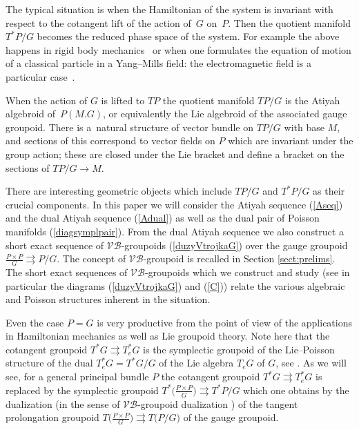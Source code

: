 \documentclass[pdftex]{sigma}
\renewcommand{\to}{\rightarrow}
\newcommand{\tto}{\rightrightarrows}
\numberwithin{equation}{section}
\begin{document}
The typical situation is when the Hamiltonian of the system is invariant with respect to the cotangent lift of the action of~$G$ on~$P$. Then the quotient manifold $T^*P/G$ becomes the reduced phase space of the system. For example the above happens in rigid body mechanics~\cite{MW} or when one formulates the equation of motion of a classical particle in a Yang--Mills f\/ield: the electromagnetic f\/ield is a particular case~\cite{Stern, Weinstein:1977}.

When the action of $G$ is lifted to $TP$ the quotient manifold $TP/G$ is the Atiyah algebroid of~$P(M.G)$, or equivalently the Lie algebroid of the associated gauge groupoid. There is a~natural structure of vector bundle on $TP/G$ with base $M$, and sections of this correspond to vector f\/ields on $P$ which are invariant under the group action; these are closed under the Lie bracket and def\/ine a bracket on the sections of $TP/G\to M$.

There are interesting geometric objects which include $TP/G$ and $T^*P/G$ as their crucial components. In this paper we will consider the Atiyah sequence (\ref{Aseq}) and the dual Atiyah sequence (\ref{Adual}) as well as the dual pair of Poisson manifolds (\ref{diagsymplpair}). From the dual Atiyah sequence we also construct a short exact sequence of $\mathcal{V}\!\mathcal{B}$-groupoids (\ref{duzyVtrojkaG}) over the gauge groupoid $\frac{P\times P}{G}\tto P/G$. The concept of $\mathcal{V}\!\mathcal{B}$-groupoid \cite{Pradines:1988} is recalled in Section \ref{sect:prelims}. The short exact sequences of $\mathcal{V}\!\mathcal{B}$-groupoids which we construct and study (see in particular the diagrams (\ref{duzyVtrojkaG}) and (\ref{C})) relate the various algebraic and Poisson structures inherent in the situation.

Even the case $P=G$ is very productive from the point of view of the applications in Hamiltonian mechanics as well as Lie groupoid theory. Note here that the cotangent groupoid $T^*G\tto T_e^*G$ is the symplectic groupoid of the Lie--Poisson structure of the dual $T^*_eG=T^*G/G$ of the Lie algebra $T_eG$ of $G$, see \cite{Wei}. As we will see, for a general principal bundle $P$ the cotangent groupoid $T^*G\tto T^*_e{G}$ is replaced by the symplectic groupoid $T^*\big(\frac{P\times P}{G}\big)\tto T^*P/G$ which one obtains by the dualization (in the sense of $\mathcal{V}\!\mathcal{B}$-groupoid dualization \cite{Mackenzie:GT, Pradines:1988}) of the tangent prolongation groupoid $T\big(\frac{P\times P}{G})\tto T(P/G\big)$ of the gauge groupoid.
\end{document}
